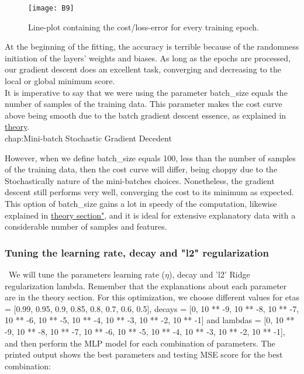 \begin{figure}[H]
\label{fig:B6}
\centering
\texttt{[image: B9]}
\caption{Line-plot containing the cost/loss-error for every training epoch.}
\end{figure}

At the beginning of the fitting, the accuracy is terrible because of the randomness initiation of the layers' weights and biases. As long as the epochs are processed, our gradient descent does an excellent task, converging and decreasing to the local or global minimum score.\\

It is imperative to say that we were using the parameter batch\_size equals the number of samples of the training data. This parameter makes the cost curve above being smooth due to the batch gradient descent essence, as explained in \hyperref[chap:Mini-batch Stochastic Gradient Decedent]{theory}.\\

chap:Mini-batch Stochastic Gradient Decedent

However, when we define batch\_size equals 100, less than the number of samples of the training data, then the cost curve will differ, being choppy due to the Stochastically nature of the mini-batches choices. Nonetheless, the gradient descent still performs very well, converging the cost to its minimum as expected. This option of batch\_size gains a lot in speedy of the computation, likewise explained in \hyperref[chap:Mini-batch Stochastic Gradient Decedent]{theory section"}, and it is ideal for extensive explanatory data with a considerable number of samples and features.

\subsubsection{Tuning the learning rate, decay and "l2" regularization}
\label{chap:Tuning the learning rate, decay and "l2" regularization}

\qquad \, We will tune the parameters learning rate ($\eta$), decay and 'l2' Ridge regularization lambda. Remember that the explanations about each parameter are in the theory section. For this optimization, we choose different values for etas = [0.99, 0.95, 0.9, 0.85, 0.8, 0.7, 0.6, 0.5], decays = [0, 10 ** -9, 10 ** -8, 10 ** -7, 10 ** -6, 10 ** -5, 10 ** -4, 10 ** -3, 10 ** -2, 10 ** -1] and lambdas = [0, 10 ** -9, 10 ** -8, 10 ** -7, 10 ** -6, 10 ** -5, 10 ** -4, 10 ** -3, 10 ** -2, 10 ** -1], and then perform the MLP model for each combination of parameters. The printed output shows the best parameters and testing MSE score for the best combination:

